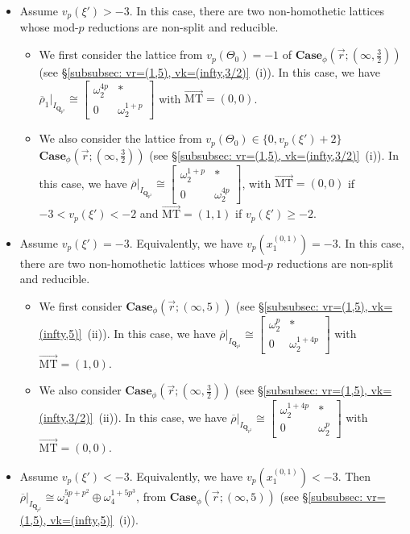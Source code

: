 \documentclass[11pt]{amsart}
\theoremstyle{definition}
\numberwithin{equation}{subsection}
\theoremstyle{plain}
\theoremstyle{plain}
\theoremstyle{plain}
\theoremstyle{plain}
\theoremstyle{plain}
\theoremstyle{plain}
\theoremstyle{plain}
\theoremstyle{plain}
\theoremstyle{plain}
\theoremstyle{plain}
\theoremstyle{plain}
\theoremstyle{plain}
\theoremstyle{definition}
\theoremstyle{definition}
\theoremstyle{definition}
\theoremstyle{remark}
\renewcommand{\(}{\textup{(}}
\renewcommand{\)}{\textup{)}}
\newcommand{\Q}{\mathbf{Q}}
\newcommand{\rhobar}{\overline{\rho}}
\newcommand{\vr}{\vec{r}}
\newcommand{\IQptwo}{{I_{\Q_{p^2}}}}
\begin{document}
\begin{itemize}[leftmargin=*]
\item Assume $v_p(\xi')>-3$. In this case, there are two non-homothetic lattices whose mod-$p$ reductions are non-split and reducible.
\begin{itemize}[leftmargin=*]
    \item We first consider the lattice from $v_p(\Theta_0)=-1$ of $\mathbf{Case}_\phi(\vr;(\infty,\frac{3}{2}))$ (see \S\ref{subsubsec: vr=(1,5), vk=(infty,3/2)}~(i)). In this case, we have $\rhobar_1|_\IQptwo\cong
    \begin{bmatrix}
        \omega_2^{4p} & * \\ 0 & \omega_2^{1+p}
    \end{bmatrix}$ with $\vec{\mathrm{MT}}=(0,0)$.
    \item We also consider the lattice from $v_p(\Theta_0)\in\{0,v_p(\xi')+2\}$ $\mathbf{Case}_\phi(\vr;(\infty,\frac{3}{2}))$ (see \S\ref{subsubsec: vr=(1,5), vk=(infty,3/2)}~(i)). In this case, we have $\rhobar|_\IQptwo\cong
    \begin{bmatrix}
        \omega_2^{1+p} & * \\ 0 & \omega_2^{4p}
    \end{bmatrix}$, with $\vec{\mathrm{MT}}=(0,0)$ if $-3<v_p(\xi')<-2$ and $\vec{\mathrm{MT}}=(1,1)$ if $v_p(\xi')\geq -2$.
\end{itemize}

\item Assume $v_p(\xi')=-3$. Equivalently, we have $v_p(x_1^{(0,1)})=-3$. In this case, there are two non-homothetic lattices whose mod-$p$ reductions are non-split and reducible. 
\begin{itemize}[leftmargin=*]
    \item We first consider $\mathbf{Case}_\phi(\vr;(\infty,5))$ (see \S\ref{subsubsec: vr=(1,5), vk=(infty,5)}~(ii)). In this case, we have $\rhobar|_\IQptwo\cong
    \begin{bmatrix}
        \omega_2^p & * \\ 0 & \omega_2^{1+4p}
    \end{bmatrix}$ with $\vec{\mathrm{MT}}=(1,0)$.
    \item We also consider $\mathbf{Case}_\phi(\vr;(\infty,\frac{3}{2}))$ (see \S\ref{subsubsec: vr=(1,5), vk=(infty,3/2)}~(ii)). In this case, we have $\rhobar|_\IQptwo\cong
    \begin{bmatrix}
        \omega_2^{1+4p} & * \\ 0 & \omega_2^p
    \end{bmatrix}$ with $\vec{\mathrm{MT}}=(0,0)$.
\end{itemize}

\item Assume $v_p(\xi')<-3$. Equivalently, we have $v_p(x_1^{(0,1)})<-3$. Then $\rhobar|_\IQptwo\cong\omega_4^{5p+p^2}\oplus\omega_4^{1+5p^3}$, from $\mathbf{Case}_\phi(\vr;(\infty,5))$ (see \S\ref{subsubsec: vr=(1,5), vk=(infty,5)}~(i)).
\end{itemize}
\end{document}
